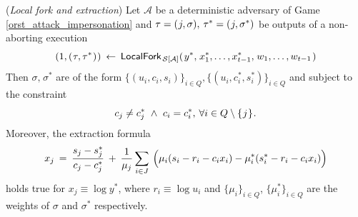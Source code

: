 \documentclass{iacrtrans}
\begin{document}
\begin{prop}\label{orst_extractability_prop}
\textup{(\textit{Local fork and extraction})}
Let $\mathcal{A}$ be a deterministic adversary of
Game \textup{\ref{orst_attack_impersonation}}
and
$\tau = (\hspace{0.5pt}j, \sigma),
\hspace{2pt}\tau^* = (\hspace{0.5pt}j, \sigma^*)$
be outputs of a non-aborting execution
\vspace{5pt}
\begin{equation*}
(
	\vspace{1pt}
	1,
	\vspace{1pt}
	(
		\hspace{0.5pt}
		\tau,
		\tau^*
		\hspace{0.5pt}
	)
	\hspace{0.5pt}
)
\hspace{2pt}
\leftarrow
\hspace{2pt}
\mathsf{LocalFork}_{
		\hspace{1pt}
    	\mathcal{S}\hspace{0pt}[
    		\hspace{0pt}
    		\mathcal{A}
    		\hspace{0pt}
    	]
    }
	(
   		\hspace{1pt}
		y ^*,
		\hspace{1pt}
		x_1^*, \dots, x_{t-1}^*,
		\hspace{1pt}
		w_1, \dots, w_{t-1}
		\hspace{1pt}
   	)
\vspace{5pt}
\end{equation*}
Then $\sigma,\hspace{1pt}\sigma^*$ are of the form
$\{(u_i, c_i, s_i)\}_{i \in Q}, \{(u_i, c_i^*, s_i^*)\}_{i \in Q}$
and subject to the constraint
\vspace{5pt}
\begin{equation}\label{orst_forked_challenges}
c_j \neq c_j^*
\ \land
\ c_i = c_i^*,\hspace{2pt}
\forall i \in Q \setminus \{\hspace{0.5pt}j\hspace{0.5pt}\}
\hspace{0.5pt}.
\vspace{5pt}
\end{equation}
Moreover, the extraction formula
\vspace{5pt}
\begin{equation}\label{orst_extraction}
x_j
\hspace{2pt}
=
\hspace{2pt}
\frac{s_j - s_j^*}{c_j - c_j^*}
\hspace{2pt}
+
\hspace{2pt}
\frac{1}{\mu_j} \sum_{i \in J}
\hspace{2pt}
\Big(
	\mu_i (s_i - r_i - c_i x_i) -
	\mu_i^* (s_i^* - r_i - c_i x_i)
\Big)
\vspace{5pt}
\end{equation}
holds true for $x_j \equiv \log y^*$, where
$r_i \equiv \log u_i$
and 
$\{\mu_i\}_{i \in Q}$, $\{\mu_i^*\}_{i \in Q}$
are the weights of
$\sigma$ and $\sigma^*$ respectively.
\end{prop}
\end{document}
